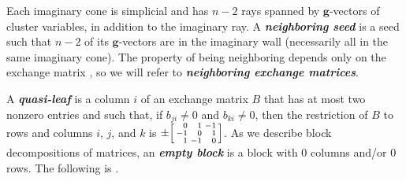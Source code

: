 \documentclass{amsart}
\theoremstyle{definition}
\theoremstyle{remark}
\numberwithin{equation}{section}
\newcommand{\newword}[1]{\textbf{\emph{#1}}}
\newcommand{\0}{{\mathbf{0}}}
\newcommand{\g}{\mathbf{g}}
\begin{document}
Each imaginary cone is simplicial and has $n-2$ rays spanned by $\g$-vectors of cluster variables, in addition to the imaginary ray.
A \newword{neighboring seed} is a seed such that $n-2$ of its $\g$-vectors are in the imaginary wall (necessarily all in the same imaginary cone).
The property of being neighboring depends only on the exchange matrix \cite[Lemma~4.36]{affdomreg}, so we will refer to \newword{neighboring exchange matrices}.

A \newword{quasi-leaf} is a column $i$ of an exchange matrix $B$ that has at most two nonzero entries and such that, if $b_{ji}\neq0$ and $b_{ki}\neq0$, then the restriction of $B$ to rows and columns $i$, $j$, and $k$ is $\pm\begin{bsmallmatrix*}[r]0&1&-1\\-1&0&1\\1&-1&0\end{bsmallmatrix*}$.
As we describe block decompositions of matrices, an \newword{empty block} is a block with $0$ columns and/or $0$ rows.
The following is \cite[Theorem~4.38]{affdomreg}.
\end{document}

